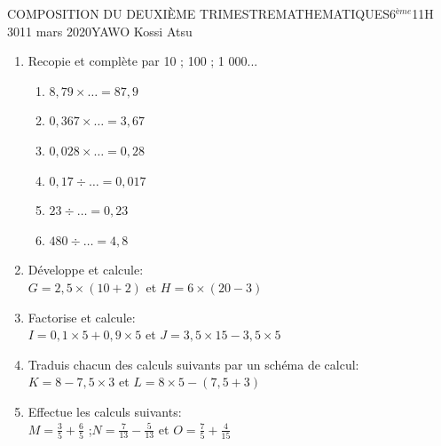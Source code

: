 \documentclass[12pt,a4paper]{book}
\newcommand{\prof}{YAWO Kossi Atsu}
\newcommand{\matiere}{MATHEMATIQUES}
\newcommand{\classe}{6$^{ème}$}
\begin{document}
\begin{devoir}{COMPOSITION DU DEUXIÈME TRIMESTRE}{\matiere}{\classe}{1}{1H 30}{11 mars 2020}{\prof}
\begin{exo}[8]
\begin{enumerate}
\item Recopie et complète par 10 ; 100 ; 1 000...
\begin{multicols}{3}
\begin{enumerate}
\item $8,79 \times \ldots = 87,9$
\item $0,367 \times \ldots = 3,67$
\item $0,028 \times \ldots = 0,28$
\item $0,17 \div \ldots= 0,017$
\item $23 \div \ldots = 0,23$
\item $480 \div \ldots = 4,8$
\end{enumerate}
\end{multicols}
\item Développe et calcule:\\
$G=2,5 \times (10+2)$ \qquad et \qquad $H=6 \times (20-3)$
\item Factorise et calcule:\\
$I=0,1 \times 5 + 0,9 \times 5$ \qquad et \qquad $J= 3,5 \times 15 - 3,5 \times 5$
\item Traduis chacun des calculs suivants par un schéma de calcul:\\
$K=8-7,5\times 3$ \qquad et \qquad $L=8 \times 5 - (7,5 + 3)$
\item Effectue les calculs suivants:\\
$M=\frac{3}{5}+\frac{6}{5}$ \qquad ;\qquad $N=\frac{7}{13}-\frac{5}{13}$ \qquad et \qquad $O=\frac{7}{5}+\frac{4}{15}$ 
\end{enumerate}
\end{exo}

\vspace{0.5cm}


\end{devoir}
\end{document}
